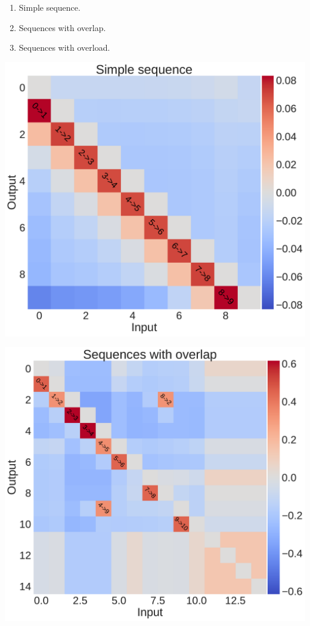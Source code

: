 \documentclass[portrait,final]{baposter}
\begin{document}
\begin{poster}
{\begin{enumerate}
\item Simple sequence.
\item Sequences with overlap.
\item Sequences with overload.
\end{enumerate}
	
	\begin{center}
    \includegraphics[scale=0.14]{matrix_normal.pdf}
  	\end{center}
  
  
  \begin{center}
    \includegraphics[scale=0.14]{matrix_overlap.pdf}
  	\end{center}
  	
}
\end{poster}
\end{document}
